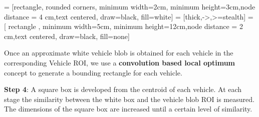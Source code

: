 \documentclass[a4paper,12pt]{article}
\begin{document}
 = [rectangle, rounded corners, minimum width=2cm, minimum height=3cm,node distance = 4 cm,text centered, draw=black, fill=white]
 = [thick,->,>=stealth]
 = [ rectangle , minimum width=5cm, minimum height=12cm,node distance = 2 cm,text centered, draw=black, fill=none]


\begin{flushleft}
Once an approximate white vehicle blob is obtained for each vehicle in the corresponding Vehicle ROI, we use a \textbf{convolution based local optimum} concept to generate a bounding rectangle for each vehicle.
\end{flushleft}

\begin{flushleft}
\textbf{Step 4}: A square box is developed from the centroid of each vehicle. At each stage the similarity between the white box and the vehicle blob ROI is measured. The dimensions of the square box are increased until a certain level of similarity.
\end{flushleft}
\end{document}
